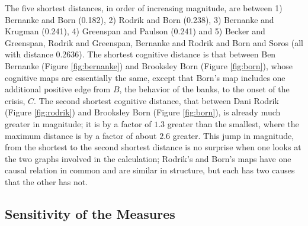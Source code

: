 \documentclass[11pt]{article}
\begin{document}
The five shortest distances, in order of increasing magnitude, are between 1) Bernanke and Born (0.182), 2) Rodrik and Born (0.238), 3) Bernanke and Krugman (0.241), 4) Greenspan and Paulson (0.241) and 5) Becker and Greenspan, Rodrik and Greenspan, Bernanke and Rodrik and Born and Soros (all with distance 0.2636). The shortest cognitive distance is that between Ben Bernanke (Figure \ref{fig:bernanke}) and Brooksley Born (Figure \ref{fig:born}), whose cognitive maps are essentially the same, except that Born's map includes one additional positive edge from $B$, the behavior of the banks, to the onset of the crisis, $C$. The second shortest cognitive distance, that between Dani Rodrik (Figure \ref{fig:rodrik}) and Brooksley Born (Figure \ref{fig:born}), is already much greater in magnitude; it is by a factor of $1.3$ greater than the smallest, where the maximum distance is by a factor of about $2.6$ greater. This jump in magnitude, from the shortest to the second shortest distance is no surprise when one looks at the two graphs involved in the calculation; Rodrik's and Born's maps have one causal relation in common and are similar in structure, but each has two causes that the other has not.
\subsection{Sensitivity of the Measures}
\label{sec-4-3}
\end{document}
